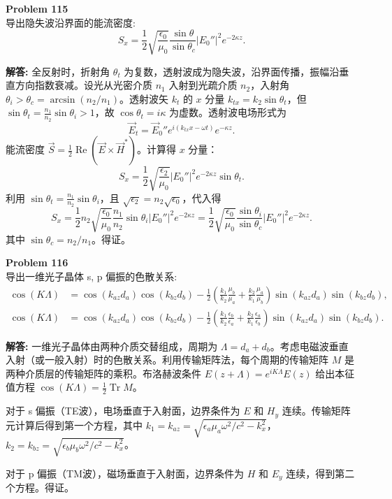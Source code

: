 \documentclass[12pt, a4paper, oneside]{ctexart}
\newenvironment{solution}{\par\noindent\textbf{解答:}\quad}{\par}
\begin{document}
\begin{mdframed}[backgroundcolor=gray!10, linewidth=0pt]
    \textbf{Problem 115} \\
    导出隐失波沿界面的能流密度:
    \[
    S_x = \frac{1}{2} \sqrt{\frac{\epsilon_0}{\mu_0}} \frac{\sin\theta}{\sin\theta_c} |E_0''|^2 e^{-2\kappa z}.
    \]
\end{mdframed}
\begin{solution}
    全反射时，折射角 $\theta_t$ 为复数，透射波成为隐失波，沿界面传播，振幅沿垂直方向指数衰减。设光从光密介质 $n_1$ 入射到光疏介质 $n_2$，入射角 $\theta_i > \theta_c = \arcsin(n_2/n_1)$。透射波矢 $k_t$ 的 $x$ 分量 $k_{tx} = k_2 \sin\theta_t$，但 $\sin\theta_t = \frac{n_1}{n_2} \sin\theta_i > 1$，故 $\cos\theta_t = i \kappa$ 为虚数。透射波电场形式为
    \[
    \vec{E}_t = \vec{E}_0'' e^{i(k_{tx} x - \omega t)} e^{-\kappa z}.
    \]
    能流密度 $\vec{S} = \frac{1}{2} \operatorname{Re}(\vec{E} \times \vec{H}^*)$。计算得 $x$ 分量：
    \[
    S_x = \frac{1}{2} \sqrt{\frac{\epsilon_2}{\mu_0}} |E_0''|^2 e^{-2\kappa z} \sin\theta_t.
    \]
    利用 $\sin\theta_t = \frac{n_1}{n_2} \sin\theta_i$，且 $\sqrt{\epsilon_2} = n_2 \sqrt{\epsilon_0}$，代入得
    \[
    S_x = \frac{1}{2} n_2 \sqrt{\frac{\epsilon_0}{\mu_0}} \frac{n_1}{n_2} \sin\theta_i |E_0''|^2 e^{-2\kappa z} = \frac{1}{2} \sqrt{\frac{\epsilon_0}{\mu_0}} \frac{\sin\theta_i}{\sin\theta_c} |E_0''|^2 e^{-2\kappa z}.
    \]
    其中 $\sin\theta_c = n_2/n_1$。得证。
\end{solution}

\begin{mdframed}[backgroundcolor=gray!10, linewidth=0pt]
    \textbf{Problem 116} \\
    导出一维光子晶体 s, p 偏振的色散关系:
    \[
    \begin{aligned}
        \cos(K\Lambda) &= \cos(k_{az} d_a) \cos(k_{bz} d_b) - \frac{1}{2} \left( \frac{k_1}{k_2} \frac{\mu_b}{\mu_a} + \frac{k_2}{k_1} \frac{\mu_a}{\mu_b} \right) \sin(k_{az} d_a) \sin(k_{bz} d_b), \\
        \cos(K\Lambda) &= \cos(k_{az} d_a) \cos(k_{bz} d_b) - \frac{1}{2} \left( \frac{k_1}{k_2} \frac{\epsilon_b}{\epsilon_a} + \frac{k_2}{k_1} \frac{\epsilon_a}{\epsilon_b} \right) \sin(k_{az} d_a) \sin(k_{bz} d_b).
    \end{aligned}
    \]
\end{mdframed}
\begin{solution}
    一维光子晶体由两种介质交替组成，周期为 $\Lambda = d_a + d_b$。考虑电磁波垂直入射（或一般入射）时的色散关系。利用传输矩阵法，每个周期的传输矩阵 $M$ 是两种介质层的传输矩阵的乘积。布洛赫波条件 $E(z+\Lambda) = e^{iK\Lambda} E(z)$ 给出本征值方程 $\cos(K\Lambda) = \frac{1}{2} \operatorname{Tr} M$。
    
    对于 s 偏振（TE波），电场垂直于入射面，边界条件为 $E$ 和 $H_y$ 连续。传输矩阵元计算后得到第一个方程，其中 $k_1 = k_{az} = \sqrt{\epsilon_a \mu_a \omega^2/c^2 - k_x^2}$，$k_2 = k_{bz} = \sqrt{\epsilon_b \mu_b \omega^2/c^2 - k_x^2}$。
    
    对于 p 偏振（TM波），磁场垂直于入射面，边界条件为 $H$ 和 $E_y$ 连续，得到第二个方程。得证。
\end{solution}
\end{document}
